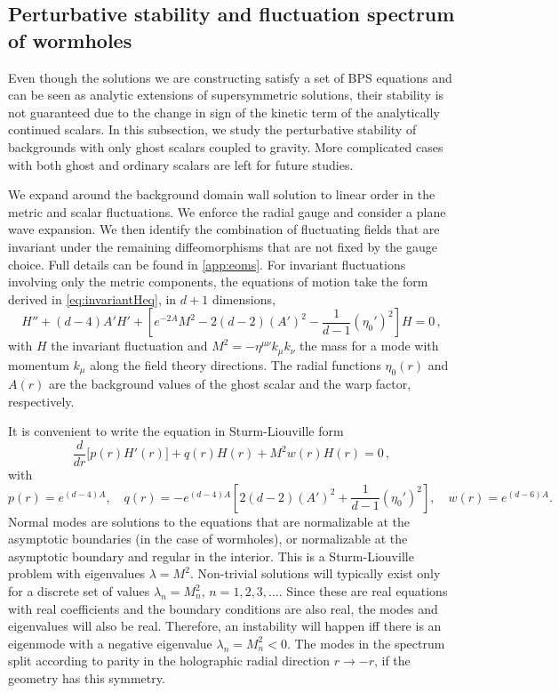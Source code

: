 \subsection{Perturbative stability and fluctuation spectrum of wormholes}

Even though the solutions we are constructing satisfy a set of BPS equations and can be seen as analytic extensions of supersymmetric solutions, their stability is not guaranteed due to the change in sign of the kinetic term of the analytically continued scalars.
In this subsection, we study the perturbative stability of backgrounds with only ghost scalars coupled to gravity.
More complicated cases with both ghost and ordinary scalars are left for future studies.

We expand around the background domain wall solution to linear order in the metric and scalar fluctuations.
We enforce the radial gauge and consider a plane wave expansion.
We then identify the combination of fluctuating fields that are invariant under the remaining diffeomorphisms that are not fixed by the gauge choice.
Full details can be found in \cref{app:eoms}.
For invariant fluctuations involving only the metric components, the equations of motion take the form derived in \cref{eq:invariantHeq}, in $d+1$ dimensions,
\begin{equation}
	H''+(d-4)A' H'+\left[e^{-2A}M^2-2(d-2)(A')^2-\frac{1}{d-1}(\eta_0')^2\right]H=0\,,
\end{equation}
with $H$ the invariant fluctuation and $M^2=-\eta^{\mu\nu}k_\mu k_\nu$ the mass for a mode with momentum $k_\mu$ along the field theory directions.
The radial functions $\eta_0(r)$ and $A(r)$ are the background values of the ghost scalar and the warp factor, respectively. 

It is convenient to write the equation in Sturm-Liouville form
\begin{equation}
	\frac{d}{dr}\Big[p(r)H'(r)\Big]+q(r)H(r)+M^2 w(r) H(r)=0\,,
\end{equation}
with
\begin{equation}
	p(r)=e^{(d-4)A}
	,\quad 
	q(r)=-e^{(d-4)A}\left[2(d-2)(A')^2+\frac{1}{d-1}(\eta_0')^2\right],\quad w(r)=e^{(d-6)A}.
\end{equation}
Normal modes are solutions to the equations that are normalizable at the asymptotic boundaries (in the case of wormholes), or normalizable at the asymptotic boundary and regular in the interior.
This is a Sturm-Liouville problem with eigenvalues $\lambda=M^2$.
Non-trivial solutions will typically exist only for a discrete set of values $\lambda_n=M_n^2$, $n=1,2,3,\dots$.
Since these are real equations with real coefficients and the boundary conditions are also real, the modes and eigenvalues will also be real.
Therefore, an instability will happen iff there is an eigenmode with a negative eigenvalue $\lambda_n=M_n^2<0$.
The modes in the spectrum split according to parity in the holographic radial direction $r\to -r$, if the geometry has this symmetry.

